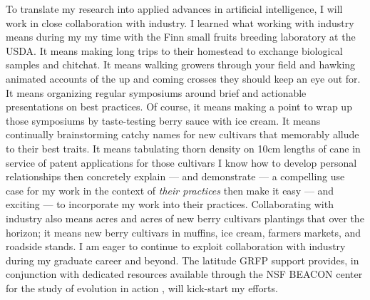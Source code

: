 To translate my research into applied advances in artificial intelligence, I will work in close collaboration with industry.
I learned what working with industry means during my my time with the Finn small fruits breeding laboratory at the USDA.
It means making long trips to their homestead to exchange biological samples and chitchat.
It means walking growers through your field and hawking animated accounts of the up and coming crosses they should keep an eye out for.
It means organizing regular symposiums around brief and actionable presentations on best practices.
Of course, it means making a point to wrap up those symposiums by taste-testing berry sauce with ice cream.
It means continually brainstorming catchy names for new cultivars that memorably allude to their best traits.
It means tabulating thorn density on 10cm lengths of cane in service of patent applications for those cultivars
I know how to develop personal relationships then concretely explain --- and demonstrate --- a compelling use case for my work in the context of \textit{their practices} then make it easy --- and exciting --- to incorporate my work into their practices.
Collaborating with industry also means acres and acres of new berry cultivars plantings that over the horizon; it means new berry cultivars in muffins, ice cream, farmers markets, and roadside stands.
I am eager to continue to exploit collaboration with industry during my graduate career and beyond.
The latitude GRFP support provides, in conjunction with dedicated resources available through the NSF BEACON center for the study of evolution in action , will kick-start my efforts.
